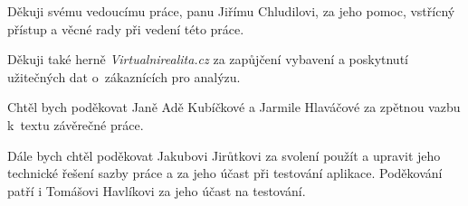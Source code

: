 Děkuji svému vedoucímu práce, panu Jiřímu Chludilovi, za jeho pomoc, vstřícný přístup a věcné rady při vedení této práce.

Děkuji také herně \emph{Virtualnirealita.cz} za zapůjčení vybavení a poskytnutí užitečných dat o~zákaznících pro analýzu.

Chtěl bych poděkovat Janě Adě Kubíčkové a Jarmile Hlaváčové za zpětnou vazbu k~textu závěrečné práce.

Dále bych chtěl poděkovat Jakubovi Jirůtkovi za svolení použít a upravit jeho technické řešení sazby práce a za jeho účast při testování aplikace. Poděkování patří i Tomášovi Havlíkovi za jeho účast na testování.